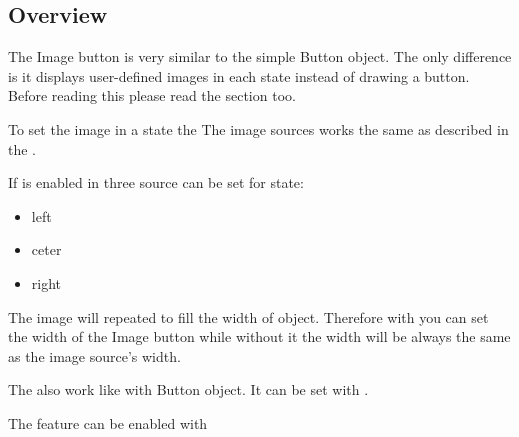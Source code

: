 \documentclass[letterpaper,10pt,english]{sphinxmanual}
\begin{document}
\subsection{Overview}
\label{\detokenize{object-types/imgbtn:overview}}
The Image button is very similar to the simple Button object. The only difference is it displays user-defined images in each state instead of drawing a button.
Before reading this please read the {\hyperref[\detokenize{object-types/btn::doc}]{}} section too.

To set the image in a state the  The image sources works the same as described in the {\hyperref[\detokenize{object-types/img::doc}]{}}.

If  is enabled in  three source can be set for state:
\begin{itemize}
\item {} 
left

\item {} 
ceter

\item {} 
right

\end{itemize}

The  image will repeated to fill the width of object. Therefore with  you can set the width of the Image button while without it the width will be always the same as the image source’s width.

The  also work like with Button object. It can be set with .

The  feature can be enabled with 
\end{document}

